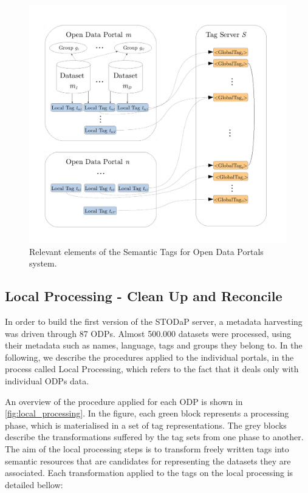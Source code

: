 \begin{figure}
\begin{center}
\includegraphics[width=\columnwidth]{images/odp_definition.pdf}
\caption{Relevant elements of the Semantic Tags for Open Data Portals system.}
\label{fig:definition}
\end{center}
\end{figure}


\subsection{Local Processing - Clean Up and Reconcile}
\label{sec:local_building}

In order to build the first version of the STODaP server, a metadata harvesting was driven through 87 ODPs.
Almost 500.000 datasets were processed, using their metadata such as names, language, tags and groups they belong to.
In the following, we describe the procedures applied to the individual portals, in the process called Local Processing, which refers to the fact that it deals only with individual ODPs data.

An overview of the procedure applied for each ODP is shown in \autoref{fig:local_processing}.
In the figure, each green block represents a processing phase, which is materialised in a set of tag representations. 
The grey blocks describe the transformations suffered by the tag sets from one phase to another.
The aim of the local processing steps is to transform freely written tags into semantic resources that are candidates for representing the datasets they are associated.
Each transformation applied to the tags on the local processing is detailed bellow:

